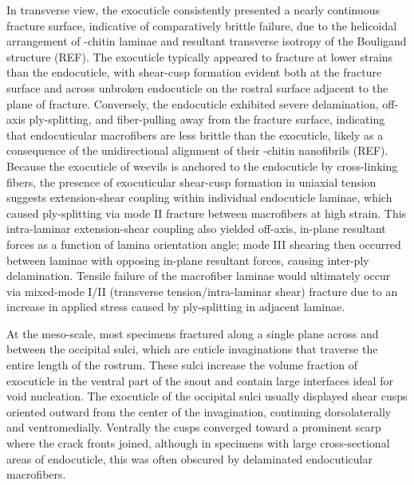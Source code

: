 \documentclass[twocolumn, linenumbers, superscriptaddress, nofootinbib]{revtex4-1}
\begin{document}
		In transverse view, the exocuticle consistently presented a nearly continuous fracture surface, indicative of comparatively brittle failure, due to the helicoidal arrangement of \textalpha-chitin laminae and resultant transverse isotropy of the Bouligand structure (REF).
		The exocuticle typically appeared to fracture at lower strains than the endocuticle, with shear-cusp formation evident both at the fracture surface and across unbroken endocuticle on the rostral surface adjacent to the plane of fracture.
		Conversely, the endocuticle exhibited severe delamination, off-axis ply-splitting, and fiber-pulling away from the fracture surface, indicating that endocuticular macrofibers are less brittle than the exocuticle, likely as a consequence of the unidirectional alignment of their \textalpha-chitin nanofibrils (REF).
		Because the exocuticle of weevils is anchored to the endocuticle by cross-linking fibers, the presence of exocuticular shear-cusp formation in uniaxial tension suggests extension-shear coupling within individual endocuticle laminae, which caused ply-splitting via mode II fracture between macrofibers at high strain.
		This intra-laminar extension-shear coupling also yielded off-axis, in-plane resultant forces as a function of lamina orientation angle; mode III shearing then occurred between laminae with opposing in-plane resultant forces, causing inter-ply delamination.
		Tensile failure of the macrofiber laminae would ultimately occur via mixed-mode I/II (transverse tension/intra-laminar shear) fracture due to an increase in applied stress caused by ply-splitting in adjacent laminae.
		
		At the meso-scale, most specimens fractured along a single plane across and between the occipital sulci, which are cuticle invaginations that traverse the entire length of the rostrum.
		These sulci increase the volume fraction of exocuticle in the ventral part of the snout and contain large interfaces ideal for void nucleation.
		The exocuticle of the occipital sulci usually displayed shear cusps oriented outward from the center of the invagination, continuing dorsolaterally and ventromedially.
		Ventrally the cusps converged toward a prominent scarp where the crack fronts joined, although in specimens with large cross-sectional areas of endocuticle, this was often obscured by delaminated endocuticular macrofibers.
		
\end{document}
